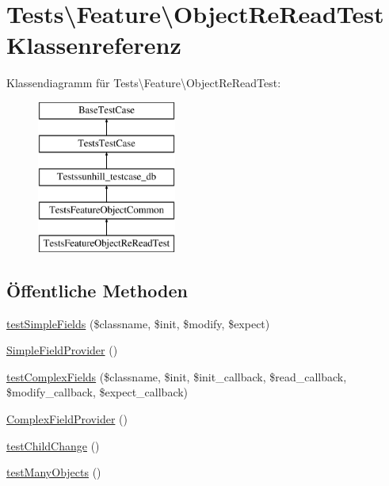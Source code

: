 \hypertarget{classTests_1_1Feature_1_1ObjectReReadTest}{}\section{Tests\textbackslash{}Feature\textbackslash{}Object\+Re\+Read\+Test Klassenreferenz}
\label{classTests_1_1Feature_1_1ObjectReReadTest}
Klassendiagramm für Tests\textbackslash{}Feature\textbackslash{}Object\+Re\+Read\+Test\+:\begin{figure}[H]
\begin{center}
\leavevmode
\includegraphics[height=5.000000cm]{d6/d20/classTests_1_1Feature_1_1ObjectReReadTest}
\end{center}
\end{figure}
\subsection*{Öffentliche Methoden}
\begin{DoxyCompactItemize}
\item 
\hyperlink{classTests_1_1Feature_1_1ObjectReReadTest_abe7f72fb82bcb4efaec84c7fed1e0178}{test\+Simple\+Fields} (\$classname, \$init, \$modify, \$expect)
\item 
\hyperlink{classTests_1_1Feature_1_1ObjectReReadTest_a99f2d0c49e859299cfe84ba538ae0074}{Simple\+Field\+Provider} ()
\item 
\hyperlink{classTests_1_1Feature_1_1ObjectReReadTest_a32330fdc6b2d8db2e672d4afcfaf39e6}{test\+Complex\+Fields} (\$classname, \$init, \$init\+\_\+callback, \$read\+\_\+callback, \$modify\+\_\+callback, \$expect\+\_\+callback)
\item 
\hyperlink{classTests_1_1Feature_1_1ObjectReReadTest_a98d9ca9d058a6347f9c57b3e4dd2db4b}{Complex\+Field\+Provider} ()
\item 
\hyperlink{classTests_1_1Feature_1_1ObjectReReadTest_a351fb897cd4bed42080b6acdea0bbaa7}{test\+Child\+Change} ()
\item 
\hyperlink{classTests_1_1Feature_1_1ObjectReReadTest_ab7278c6b90bd7624d2067b6587c8a398}{test\+Many\+Objects} ()
\end{DoxyCompactItemize}
